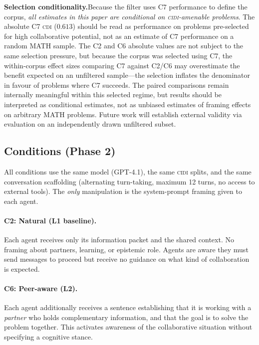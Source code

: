 \documentclass{article}
\newcommand{\CDI}{\textsc{cdi}}
\newcommand{\CIDI}{\textsc{cidi}}
\begin{document}
\textbf{Selection conditionality.}\enspace Because the filter uses C7
performance to define the corpus, \emph{all estimates in this paper
are conditional on \CIDI-amenable problems}. The absolute C7 \CDI{}
($0.613$) should be read as performance on problems pre-selected for
high collaborative potential, not as an estimate of C7 performance on
a random MATH sample. The C2 and C6 absolute values are not subject
to the same selection pressure, but because the corpus was selected
using C7, the within-corpus effect sizes comparing C7 against C2/C6
may overestimate the benefit expected on an unfiltered sample---the
selection inflates the denominator in favour of problems where C7
succeeds. The paired comparisons remain internally meaningful within
this selected regime, but results should be interpreted as conditional
estimates, not as unbiased estimates of framing effects on arbitrary
MATH problems. Future work will establish external validity via
evaluation on an independently drawn unfiltered subset.

\subsection{Conditions (Phase 2)}

All conditions use the same model (GPT-4.1), the same \CIDI{} splits,
and the same conversation scaffolding (alternating turn-taking,
maximum 12 turns, no access to external tools). The \emph{only}
manipulation is the system-prompt framing given to each agent.

\paragraph{C2: Natural (L1 baseline).}
Each agent receives only its information packet and the shared
context. No framing about partners, learning, or epistemic role.
Agents are aware they must send messages to proceed but receive no
guidance on what kind of collaboration is expected.

\paragraph{C6: Peer-aware (L2).}
Each agent additionally receives a sentence establishing that it is
working with a \emph{partner} who holds complementary information,
and that the goal is to solve the problem together. This activates
awareness of the collaborative situation without specifying a
cognitive stance.
\end{document}
